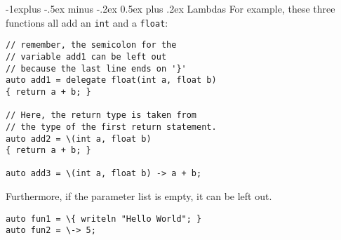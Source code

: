 \documentclass[a4paper,10pt,landscape]{article}
\makeatletter
\newenvironment{segment}[1]
{\begin{mdframed}[roundcorner=5pt]\subsection{#1}}
{\end{mdframed}\vspace{2pt plus 5pt}}
\renewcommand{\subsection}{\@startsection{subsection}{2}{0mm}%
			      {-1explus -.5ex minus -.2ex}%
			      {0.5ex plus .2ex}%
			      {\normalfont\normalsize\bfseries}}
\makeatother
\begin{document}
\begin{multicols}{3}
\begin{segment}{Lambdas}
For example, these three functions all add an \texttt{int} and a \texttt{float}:

\begin{lstlisting}
// remember, the semicolon for the
// variable add1 can be left out
// because the last line ends on '}'
auto add1 = delegate float(int a, float b)
{ return a + b; }

// Here, the return type is taken from
// the type of the first return statement.
auto add2 = \(int a, float b)
{ return a + b; }

auto add3 = \(int a, float b) -> a + b;
\end{lstlisting}

Furthermore, if the parameter list is empty, it can be left out.

\begin{lstlisting}
auto fun1 = \{ writeln "Hello World"; }
auto fun2 = \-> 5;
\end{lstlisting}

\end{segment}

\end{multicols}
\end{document}
